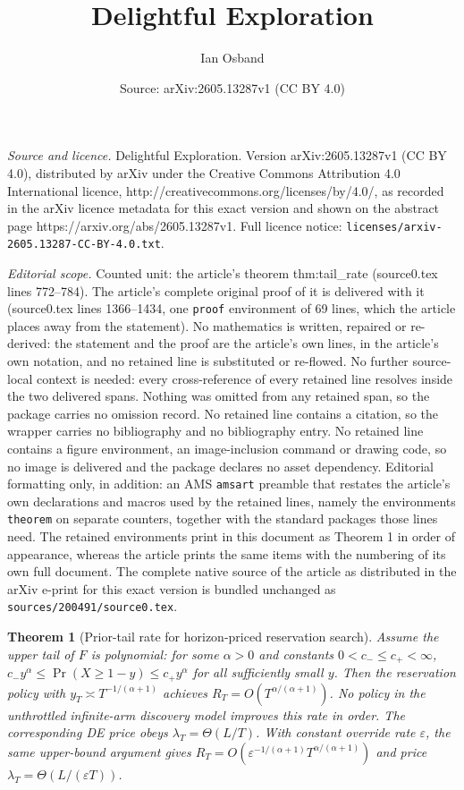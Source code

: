 \documentclass[10pt,a4paper]{amsart}
\title{Delightful Exploration}
\author{Ian Osband}
\date{Source: arXiv:2605.13287v1 (CC BY 4.0)}
\newtheorem{theorem}{Theorem}
\begin{document}
\maketitle

\noindent\emph{Source and licence.} Delightful Exploration. Version arXiv:2605.13287v1 (CC BY 4.0), distributed by arXiv under the Creative Commons Attribution 4.0 International licence, http://creativecommons.org/licenses/by/4.0/, as recorded in the arXiv licence metadata for this exact version and shown on the abstract page https://arxiv.org/abs/2605.13287v1. Full licence notice: \texttt{licenses/arxiv-2605.13287-CC-BY-4.0.txt}.\par\smallskip

\noindent\textit{Editorial scope.} Counted unit: the article's theorem thm:tail\_rate (source0.tex lines 772--784). The article's complete original proof of it is delivered with it (source0.tex lines 1366--1434, one \texttt{proof} environment of 69 lines, which the article places away from the statement). No mathematics is written, repaired or re-derived: the statement and the proof are the article's own lines, in the article's own notation, and no retained line is substituted or re-flowed.  No further source-local context is needed: every cross-reference of every retained line resolves inside the two delivered spans.  Nothing was omitted from any retained span, so the package carries no omission record.  No retained line contains a citation, so the wrapper carries no bibliography and no bibliography entry.  No retained line contains a figure environment, an image-inclusion command or drawing code, so no image is delivered and the package declares no asset dependency.  Editorial formatting only, in addition: an AMS \texttt{amsart} preamble that restates the article's own declarations and macros used by the retained lines, namely the environments \texttt{theorem} on separate counters, together with the standard packages those lines need.  The retained environments print in this document as Theorem 1 in order of appearance, whereas the article prints the same items with the numbering of its own full document.  The complete native source of the article as distributed in the arXiv e-print for this exact version is bundled unchanged as \texttt{sources/200491/source0.tex}.
\begin{theorem}[Prior-tail rate for horizon-priced reservation search]
\label{thm:tail_rate}
Assume the upper tail of $F$ is polynomial: for some $\alpha>0$ and constants $0<c_-\le c_+<\infty$,
$c_-y^\alpha \le \Pr(X\ge 1-y) \le c_+y^\alpha$
for all sufficiently small $y$.
Then the reservation policy with $y_T \asymp T^{-1/(\alpha+1)}$ achieves
$R_T = O(T^{\alpha/(\alpha+1)})$.
No policy in the unthrottled infinite-arm discovery model improves this rate in order.
The corresponding DE price obeys $\lambda_T = \Theta(L/T)$.
With constant override rate $\varepsilon$, the same upper-bound argument gives
$R_T = O(\varepsilon^{-1/(\alpha+1)}T^{\alpha/(\alpha+1)})$
and price $\lambda_T = \Theta(L/(\varepsilon T))$.
\end{theorem}
\end{document}
